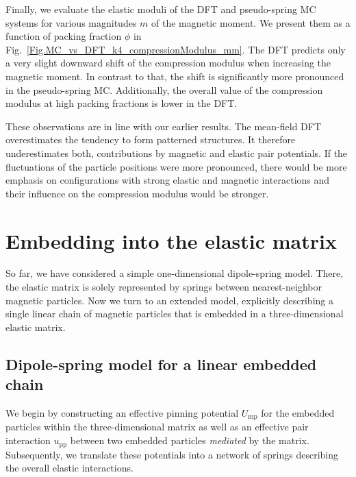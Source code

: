 \documentclass[aps,pre,twocolumn,superscriptaddress,nofootinbib]{revtex4}
\begin{document}
Finally, we evaluate the elastic moduli of the DFT and pseudo-spring MC systems for various magnitudes $m$ of the magnetic moment. 
We present them as a function of packing fraction $\phi$ in Fig.~\ref{Fig.MC_vs_DFT_k4_compressionModulus_mm}.
The DFT predicts only a very slight downward shift of the compression modulus when increasing the magnetic moment. 
In contrast to that, the shift is significantly more pronounced in the pseudo-spring MC. 
Additionally, the overall value of the compression modulus at high packing fractions is lower in the DFT.

These observations are in line with our earlier results. 
The mean-field DFT overestimates the tendency to form patterned structures. 
It therefore underestimates both, contributions by magnetic and elastic pair potentials. 
If the fluctuations of the particle positions were more pronounced, there would be more emphasis on configurations with strong elastic and magnetic interactions and their influence on the compression modulus would be stronger. 


\section{Embedding into the elastic matrix}
\label{Sec.Embedding_into_the_elastic_matrix}
So far, we have considered a simple one-dimensional dipole-spring model. 
There, the elastic matrix is solely represented by springs between nearest-neighbor magnetic particles. 
Now we turn to an extended model, explicitly describing a single linear chain of magnetic particles that is embedded in a three-dimensional elastic matrix.

\subsection{Dipole-spring model for a linear embedded chain}

We begin by constructing an effective pinning potential $U_\textrm{mp}$ for the embedded particles within the three-dimensional matrix as well as an effective pair interaction $u_\textrm{pp}$ between two embedded particles \emph{mediated} by the matrix. 
Subsequently, we translate these potentials into a network of springs describing the overall elastic interactions.
\end{document}
